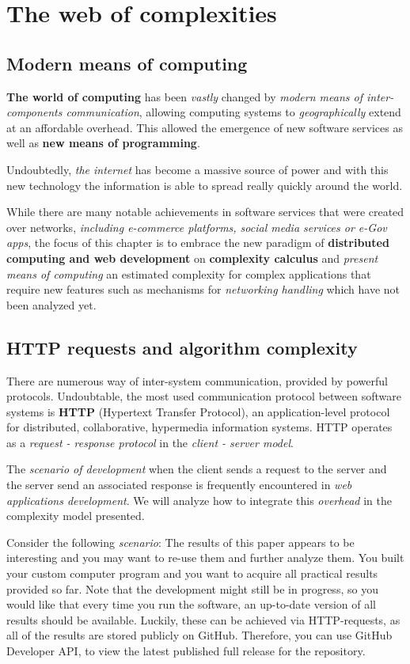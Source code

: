 \chapter{The web of complexities}

\section{Modern means of computing}
\textbf{The world of computing} has been \textit{vastly} changed by \textit{modern means of inter-components communication}, allowing computing systems to \textit{geographically} extend at an affordable overhead. This allowed the emergence of new software services as well as \textbf{new means of programming}. 

Undoubtedly, \textit{the internet} has become a massive source of power and with this new technology the information is able to spread really quickly around the world.

While there are many notable achievements in software services that were created over networks, \textit{including e-commerce platforms, social media services or e-Gov apps}, the focus of this chapter is to embrace the new paradigm of \textbf{distributed computing and web development} on \textbf{complexity calculus} and \textit{present means of computing} an estimated complexity for complex applications that require new features such as mechanisms for \textit{networking handling} which have not been analyzed yet.

\section{HTTP requests and algorithm complexity}

There are numerous way of inter-system communication, provided by powerful protocols. Undoubtable, the most used communication protocol between software systems is \textbf{HTTP} (Hypertext Transfer Protocol), an application-level protocol for distributed, collaborative, hypermedia information systems. HTTP operates as a \textit{request - response protocol} in the \textit{client - server  model}.

The \textit{scenario of development} when the client sends a request to the server and the server send an associated response is frequently encountered in \textit{web applications development}. We will analyze how to integrate this \textit{overhead} in the complexity model presented.

Consider the following \textit{scenario}: The results of this paper appears to be interesting and you may want to re-use them and further analyze them. You built your custom computer program and you want to acquire all practical results provided so far. Note that the development might still be in progress, so you would like that every time you run the software, an up-to-date version of all results should be available. Luckily, these can be achieved via HTTP-requests, as all of the results are stored publicly on GitHub. Therefore, you can use GitHub Developer API, to view the latest published full release for the repository.

